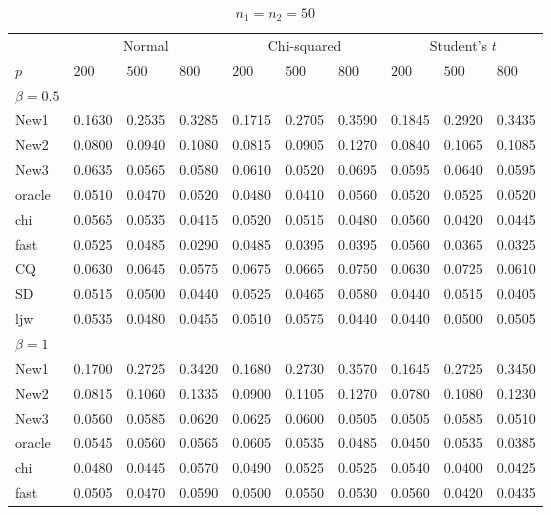 \documentclass[review]{elsarticle}
\theoremstyle{plain}
\theoremstyle{definition}
\theoremstyle{remark}
\begin{document}
\begin{table}[ht]
\caption{$n_1=n_2=50$} 
\label{hahaha}
\vspace{3mm}
\centering
\begin{tabular}{llllllllll}
\toprule
    &   \multicolumn{3}{c}{Normal} & \multicolumn{3}{c}{Chi-squared}& \multicolumn{3}{c}{Student's $t$}  \\
    \cmidrule(r){2-4}
\cmidrule(r){5-7}
\cmidrule(r){8-10}
    $p$ & $200$ &  $500$ & $800$ & $200$  & $500$ & $800$ & $200$ & $500$ & $800$ \\ 
\midrule
    $\beta=0.5$\\
New1 & 0.1630 & 0.2535 & 0.3285 & 0.1715 & 0.2705 & 0.3590 & 0.1845 & 0.2920 & 0.3435 \\ 
New2 & 0.0800 & 0.0940 & 0.1080 & 0.0815 & 0.0905 & 0.1270 & 0.0840 & 0.1065 & 0.1085 \\ 
New3 & 0.0635 & 0.0565 & 0.0580 & 0.0610 & 0.0520 & 0.0695 & 0.0595 & 0.0640 & 0.0595 \\ 
oracle & 0.0510 & 0.0470 & 0.0520 & 0.0480 & 0.0410 & 0.0560 & 0.0520 & 0.0525 & 0.0520 \\ 
chi & 0.0565 & 0.0535 & 0.0415 & 0.0520 & 0.0515 & 0.0480 & 0.0560 & 0.0420 & 0.0445 \\ 
fast & 0.0525 & 0.0485 & 0.0290 & 0.0485 & 0.0395 & 0.0395 & 0.0560 & 0.0365 & 0.0325 \\ 
CQ & 0.0630 & 0.0645 & 0.0575 & 0.0675 & 0.0665 & 0.0750 & 0.0630 & 0.0725 & 0.0610 \\ 
SD & 0.0515 & 0.0500 & 0.0440 & 0.0525 & 0.0465 & 0.0580 & 0.0440 & 0.0515 & 0.0405 \\ 
ljw & 0.0535 & 0.0480 & 0.0455 & 0.0510 & 0.0575 & 0.0440 & 0.0440 & 0.0500 & 0.0505 \\ 
    $\beta=1$\\
New1 & 0.1700 & 0.2725 & 0.3420 & 0.1680 & 0.2730 & 0.3570 & 0.1645 & 0.2725 & 0.3450 \\ 
New2 & 0.0815 & 0.1060 & 0.1335 & 0.0900 & 0.1105 & 0.1270 & 0.0780 & 0.1080 & 0.1230 \\ 
New3 & 0.0560 & 0.0585 & 0.0620 & 0.0625 & 0.0600 & 0.0505 & 0.0505 & 0.0585 & 0.0510 \\ 
oracle & 0.0545 & 0.0560 & 0.0565 & 0.0605 & 0.0535 & 0.0485 & 0.0450 & 0.0535 & 0.0385 \\ 
chi & 0.0480 & 0.0445 & 0.0570 & 0.0490 & 0.0525 & 0.0525 & 0.0540 & 0.0400 & 0.0425 \\ 
fast & 0.0505 & 0.0470 & 0.0590 & 0.0500 & 0.0550 & 0.0530 & 0.0560 & 0.0420 & 0.0435 \\ 

\end{tabular}
\end{table}
\end{document}
